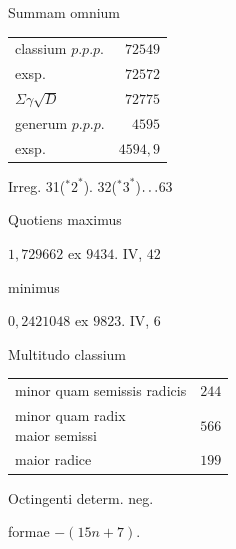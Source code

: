 \par\medskip\noindent Summam omnium
\begin{center}\begin{tabular}{@{}lr@{}}
classium $p.p.p.$ & $72549$\\
\quad exsp. & $72572$\\
\quad $\Sigma\gamma\surd D$ & $72775$\\
generum $p.p.p.$ & $4595$\\
\quad exsp. & $4594{,}9$
\end{tabular}\end{center}
\noindent Irreg. 31(${}^{*}2^{*}$). 32(${}^{*}3^{*}$)\(\mathinner{.\,.\,.}\)63
\par\noindent Quotiens maximus
\par\noindent\quad $1{,}729662$ ex $9434$. IV, $42$
\par\noindent minimus
\par\noindent\quad $0{,}2421048$ ex $9823$. IV, $6$
\par\noindent Multitudo classium
\begin{center}\begin{tabular}{@{}lr@{}}
minor quam semissis radicis & $244$\\
\shortstack[l]{minor quam radix\\\quad maior semissi} & $566$\\
maior radice & $199$
\end{tabular}\end{center}
\par\medskip
{}
\noindent Octingenti determ. neg.\par\noindent formae $-(15n+7)$.
\par\medskip
\begingroup\small
\setlength{\tabcolsep}{4pt}
